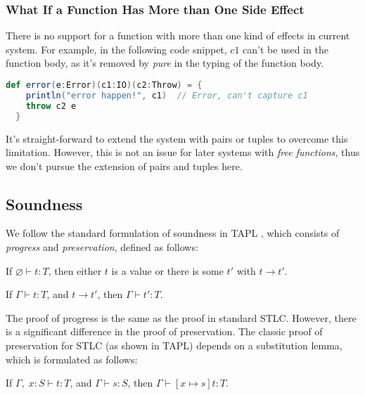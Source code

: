 \subsubsection{What If a Function Has More than One Side Effect}

There is no support for a function with more than one kind of effects
in current system. For example, in the following code snippet, $c1$
can't be used in the function body, as it's removed by \emph{pure} in
the typing of the function body.

\begin{lstlisting}[language=Scala]
  def error(e:Error)(c1:IO)(c2:Throw) = {
    println("error happen!", c1)  // Error, can't capture c1
    throw c2 e
  }
\end{lstlisting}

It's straight-forward to extend the system with pairs or tuples to
overcome this limitation. However, this is not an issue for later
systems with \emph{free functions}, thus we don't pursue the extension
of pairs and tuples here.

\subsection{Soundness}

We follow the standard formulation of soundness in TAPL
\cite{bpierce2002types}, which consists of \emph{progress} and
\emph{preservation}, defined as follows:

\begin{theorem}[Progress]
If $\varnothing \vdash t : T$, then either $t$ is a value or there is some
$t'$ with $t \longrightarrow t'$.
\end{theorem}

\begin{theorem}[Preservation]
If $\Gamma \vdash t : T$, and $t \longrightarrow t'$, then $\Gamma
\vdash t' : T$.
\end{theorem}

The proof of progress is the same as the proof in standard
STLC. However, there is a significant difference in the proof of
preservation. The classic proof of preservation for STLC (as shown in
TAPL) depends on a substitution lemma, which is formulated as follows:

\begin{lemma}
If $\Gamma,\; x:S \vdash t : T$, and $\Gamma \vdash s : S$, then $\Gamma
\vdash [x \mapsto s]t : T$.
\end{lemma}

